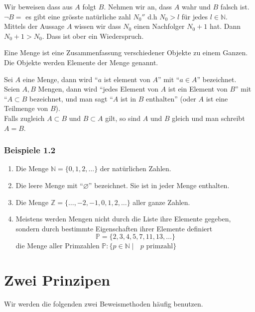 \noindent Wir beweisen dass aus $A$ folgt $B$. Nehmen wir an, dass $A$ wahr und $B$ falsch ist. \\

\noindent $\lnot B=$ es gibt eine grösste natürliche zahl $N_0''$ d.h $N_0>l$ für jedes $l \in \mathbb{N}$.\\

Mittels der Aussage $A$ wissen wir dass $N_0$ einen Nachfolger $N_0 +1$ hat. Dann $N_0+1>N_0$. Dass ist ober ein Wiederspruch.

\begin{definition}{1.1}
Eine Menge ist eine Zusammenfassung verschiedener Objekte zu einem Ganzen.\\
Die Objekte werden Elemente der Menge genannt. 
\end{definition}

Sei $A$ eine Menge, dann wird ``$a$ ist element von $A$'' mit ``$a\in A$'' bezeichnet.\\
Seien $A,B$ Mengen, dann wird ``jedes Element von $A$ ist ein Element von $B$'' mit ``$A\subset B$ bezeichnet, und man sagt ``$A$ ist in $B$ enthalten'' (oder $A$ ist eine Teilmenge von $B$). \\

Falls zugleich $A\subset B$ und $B\subset A$ gilt, so sind $A$ und $B$ gleich und man schreibt $A=B$. 

\subsubsection*{Beispiele 1.2}
\begin{enumerate}
	\item Die Menge $\mathbb{N}=\{0,1,2,\dots\}$ der natürlichen Zahlen.
	\item Die leere Menge mit ``$\varnothing$'' bezeichnet. Sie ist in jeder Menge enthalten.
	\item Die Menge $\mathbb{Z}=\{\dots,-2,-1,0,1,2,\dots\}$ aller ganze Zahlen.
	\item Meistens werden Mengen nicht durch die Liste ihre Elemente gegeben, sondern durch bestimmte Eigenschaften ihrer Elemente definiert \[\mathbb{P}=\{2,3,4,5,7,11,13,\dots\}\] die Menge aller Primzahlen $\mathbb{P}:\{p\in\mathbb{N}\mid\text{ $p$ primzahl}\}$
\end{enumerate}
\section{Zwei Prinzipen}
Wir werden die folgenden zwei Beweismethoden häufig benutzen.

